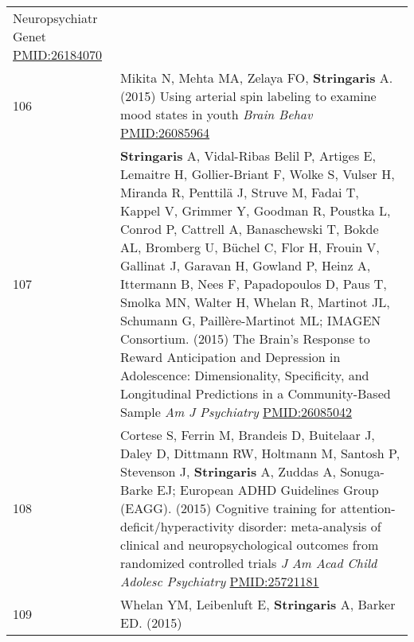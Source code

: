 \documentclass[
]{article}
\begin{document}
\begin{longtable}[]{@{}ll@{}}
\begin{minipage}[t]{0.94\columnwidth}
{Neuropsychiatr Genet} \url{PMID:26184070}\strut
\end{minipage}\tabularnewline
\begin{minipage}[t]{0.01\columnwidth}\raggedright
106\strut
\end{minipage} & \begin{minipage}[t]{0.94\columnwidth}\raggedright
Mikita N, Mehta MA, Zelaya FO, \textbf{Stringaris} A. (2015) Using
arterial spin labeling to examine mood states in youth \emph{Brain
Behav} \url{PMID:26085964}\strut
\end{minipage}\tabularnewline
\begin{minipage}[t]{0.01\columnwidth}\raggedright
107\strut
\end{minipage} & \begin{minipage}[t]{0.94\columnwidth}\raggedright
\textbf{Stringaris} A, Vidal-Ribas Belil P, Artiges E, Lemaitre H,
Gollier-Briant F, Wolke S, Vulser H, Miranda R, Penttilä J, Struve M,
Fadai T, Kappel V, Grimmer Y, Goodman R, Poustka L, Conrod P, Cattrell
A, Banaschewski T, Bokde AL, Bromberg U, Büchel C, Flor H, Frouin V,
Gallinat J, Garavan H, Gowland P, Heinz A, Ittermann B, Nees F,
Papadopoulos D, Paus T, Smolka MN, Walter H, Whelan R, Martinot JL,
Schumann G, Paillère-Martinot ML; IMAGEN Consortium. (2015) The Brain's
Response to Reward Anticipation and Depression in Adolescence:
Dimensionality, Specificity, and Longitudinal Predictions in a
Community-Based Sample \emph{Am J Psychiatry} \url{PMID:26085042}\strut
\end{minipage}\tabularnewline
\begin{minipage}[t]{0.01\columnwidth}\raggedright
108\strut
\end{minipage} & \begin{minipage}[t]{0.94\columnwidth}\raggedright
Cortese S, Ferrin M, Brandeis D, Buitelaar J, Daley D, Dittmann RW,
Holtmann M, Santosh P, Stevenson J, \textbf{Stringaris} A, Zuddas A,
Sonuga-Barke EJ; European ADHD Guidelines Group (EAGG). (2015) Cognitive
training for attention-deficit/hyperactivity disorder: meta-analysis of
clinical and neuropsychological outcomes from randomized controlled
trials \emph{J Am Acad Child Adolesc Psychiatry}
\url{PMID:25721181}\strut
\end{minipage}\tabularnewline
\begin{minipage}[t]{0.01\columnwidth}\raggedright
109\strut
\end{minipage} & \begin{minipage}[t]{0.94\columnwidth}\raggedright
Whelan YM, Leibenluft E, \textbf{Stringaris} A, Barker ED. (2015)

\end{minipage}
\end{longtable}
\end{document}
